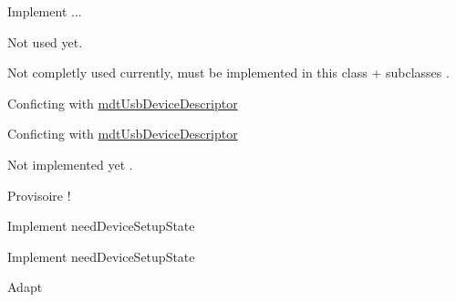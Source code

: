 \begin{DoxyRefList}
Implement ...  
\item[\label{todo__todo000003}%
\hypertarget{todo__todo000003}{}%
Member \hyperlink{classmdt_data_table_manager_a1e19b3f34c1b0a91bcae4396731efc57}{mdt\-Data\-Table\-Manager\-:\-:set\-Data\-Set\-Directory} (const Q\-Dir \&dir)]Not used yet.  
\item[\label{todo__todo000010}%
\hypertarget{todo__todo000010}{}%
Member \hyperlink{classmdt_device_a79ca328ff9e9f413a38c1cc9c9267cee}{mdt\-Device\-:\-:last\-Error} () const ]Not completly used currently, must be implemented in this class + subclasses .  
\item[\label{todo__todo000025}%
\hypertarget{todo__todo000025}{}%
Member \hyperlink{classmdt_device_info_afe4bbdc87acff59999905a0eeb812fe1}{mdt\-Device\-Info\-:\-:product\-Name} () const ]Conficting with \hyperlink{classmdt_usb_device_descriptor}{mdt\-Usb\-Device\-Descriptor}  
\item[\label{todo__todo000024}%
\hypertarget{todo__todo000024}{}%
Member \hyperlink{classmdt_device_info_a207d7b6b49fd65726232e95cd9e0568c}{mdt\-Device\-Info\-:\-:vendor\-Name} () const ]Conficting with \hyperlink{classmdt_usb_device_descriptor}{mdt\-Usb\-Device\-Descriptor}  
\item[\label{todo__todo000012}%
\hypertarget{todo__todo000012}{}%
Member \hyperlink{classmdt_device_modbus_abfcab17fbf05aab7843ae689316dd01f}{mdt\-Device\-Modbus\-:\-:connect\-To\-Device} ()]Not implemented yet .  
\item[\label{todo__todo000011}%
\hypertarget{todo__todo000011}{}%
Member \hyperlink{classmdt_device_modbus_ac69cfbe26681342ba05672ab63de2a1f}{mdt\-Device\-Modbus\-:\-:mdt\-Device\-Modbus} (Q\-Object $\ast$parent=0)]Provisoire !  
\item[\label{todo__todo000013}%
\hypertarget{todo__todo000013}{}%
Member \hyperlink{classmdt_device_modbus_wago_module_aa775cffab72f7ed7cd92a48d26da3225}{mdt\-Device\-Modbus\-Wago\-Module\-:\-:read\-Registers} (int first\-Channel, int last\-Channel, bool need\-Device\-Setup\-State)]Implement need\-Device\-Setup\-State  
\item[\label{todo__todo000015}%
\hypertarget{todo__todo000015}{}%
Member \hyperlink{classmdt_device_modbus_wago_module_a90bd4625c8b1efcd34cd56b31dc2f72c}{mdt\-Device\-Modbus\-Wago\-Module\-:\-:read\-Status\-Bytes} (int first\-Channel, int last\-Channel, bool need\-Device\-Setup\-State)]Implement need\-Device\-Setup\-State  
\item[\label{todo__todo000017}%
\hypertarget{todo__todo000017}{}%
Member \hyperlink{classmdt_device_modbus_wago_module_adf7431cd4d41d7839b42cc21badeabc5}{mdt\-Device\-Modbus\-Wago\-Module\-:\-:setup\-From\-Register\-Word} (quint16 word)]Adapt 

\end{DoxyRefList}
